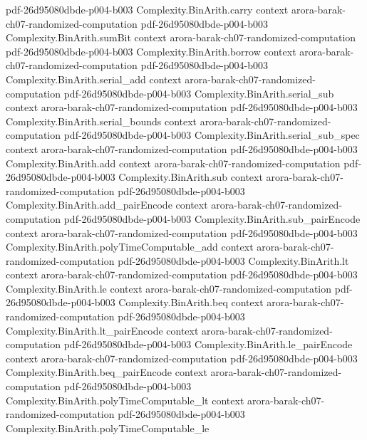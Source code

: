 \begin{theorem}
  {pdf-26d95080dbde-p004-b003}
\proofstep
  {Complexity.BinArith.carry}
  {context}
  {arora-barak-ch07-randomized-computation}
  {pdf-26d95080dbde-p004-b003}
\proofstep
  {Complexity.BinArith.sumBit}
  {context}
  {arora-barak-ch07-randomized-computation}
  {pdf-26d95080dbde-p004-b003}
\proofstep
  {Complexity.BinArith.borrow}
  {context}
  {arora-barak-ch07-randomized-computation}
  {pdf-26d95080dbde-p004-b003}
\proofstep
  {Complexity.BinArith.serial_add}
  {context}
  {arora-barak-ch07-randomized-computation}
  {pdf-26d95080dbde-p004-b003}
\proofstep
  {Complexity.BinArith.serial_sub}
  {context}
  {arora-barak-ch07-randomized-computation}
  {pdf-26d95080dbde-p004-b003}
\proofstep
  {Complexity.BinArith.serial_bounds}
  {context}
  {arora-barak-ch07-randomized-computation}
  {pdf-26d95080dbde-p004-b003}
\proofstep
  {Complexity.BinArith.serial_sub_spec}
  {context}
  {arora-barak-ch07-randomized-computation}
  {pdf-26d95080dbde-p004-b003}
\proofstep
  {Complexity.BinArith.add}
  {context}
  {arora-barak-ch07-randomized-computation}
  {pdf-26d95080dbde-p004-b003}
\proofstep
  {Complexity.BinArith.sub}
  {context}
  {arora-barak-ch07-randomized-computation}
  {pdf-26d95080dbde-p004-b003}
\proofstep
  {Complexity.BinArith.add_pairEncode}
  {context}
  {arora-barak-ch07-randomized-computation}
  {pdf-26d95080dbde-p004-b003}
\proofstep
  {Complexity.BinArith.sub_pairEncode}
  {context}
  {arora-barak-ch07-randomized-computation}
  {pdf-26d95080dbde-p004-b003}
\proofstep
  {Complexity.BinArith.polyTimeComputable_add}
  {context}
  {arora-barak-ch07-randomized-computation}
  {pdf-26d95080dbde-p004-b003}
\proofstep
  {Complexity.BinArith.lt}
  {context}
  {arora-barak-ch07-randomized-computation}
  {pdf-26d95080dbde-p004-b003}
\proofstep
  {Complexity.BinArith.le}
  {context}
  {arora-barak-ch07-randomized-computation}
  {pdf-26d95080dbde-p004-b003}
\proofstep
  {Complexity.BinArith.beq}
  {context}
  {arora-barak-ch07-randomized-computation}
  {pdf-26d95080dbde-p004-b003}
\proofstep
  {Complexity.BinArith.lt_pairEncode}
  {context}
  {arora-barak-ch07-randomized-computation}
  {pdf-26d95080dbde-p004-b003}
\proofstep
  {Complexity.BinArith.le_pairEncode}
  {context}
  {arora-barak-ch07-randomized-computation}
  {pdf-26d95080dbde-p004-b003}
\proofstep
  {Complexity.BinArith.beq_pairEncode}
  {context}
  {arora-barak-ch07-randomized-computation}
  {pdf-26d95080dbde-p004-b003}
\proofstep
  {Complexity.BinArith.polyTimeComputable_lt}
  {context}
  {arora-barak-ch07-randomized-computation}
  {pdf-26d95080dbde-p004-b003}
\proofstep
  {Complexity.BinArith.polyTimeComputable_le}

\end{theorem}
